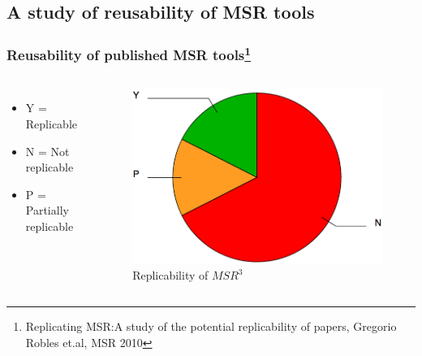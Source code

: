     \subsection{A study of reusability of MSR tools}
        \begin{frame}
            \frametitle{Reusability of published MSR tools\footnote{\label{replicability}{Replicating MSR:A study of the potential replicability of papers, Gregorio Robles et.al,  MSR 2010}}}
            \begin{columns}
                    \centering
                        \begin{itemize}
                            \item Y = Replicable
                            \item N = Not replicable
                            \item P = Partially replicable
                        \end{itemize}

                    \centering
                    \begin{figure}
                        \centering
                        \includegraphics[width=0.75\linewidth]{figures/toolsavailability.png}
                        \caption{Replicability of $MSR^{3}$}
                    \end{figure}
            \end{columns}
        \end{frame}
